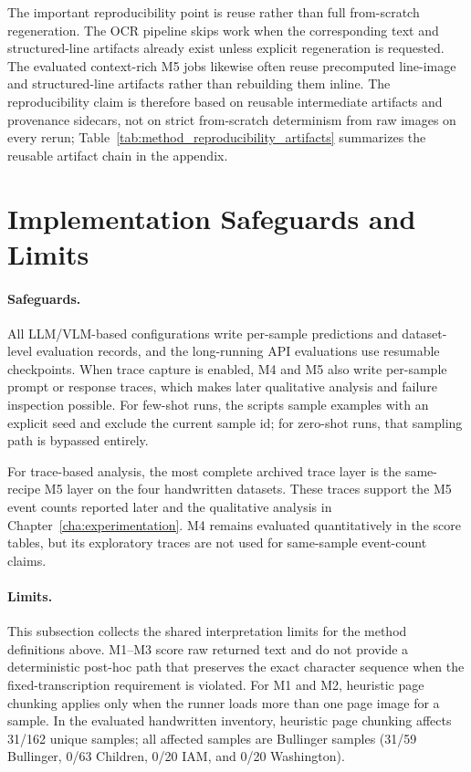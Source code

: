 The important reproducibility point is reuse rather than full from-scratch regeneration. The OCR pipeline skips work when the corresponding text and structured-line artifacts already exist unless explicit regeneration is requested. The evaluated context-rich M5 jobs likewise often reuse precomputed line-image and structured-line artifacts rather than rebuilding them inline. The reproducibility claim is therefore based on reusable intermediate artifacts and provenance sidecars, not on strict from-scratch determinism from raw images on every rerun; Table~\ref{tab:method_reproducibility_artifacts} summarizes the reusable artifact chain in the appendix.

\section{Implementation Safeguards and Limits}
\label{sec:method_safeguards_limits}

\paragraph{Safeguards.}
All LLM/VLM-based configurations write per-sample predictions and dataset-level evaluation records, and the long-running API evaluations use resumable checkpoints. When trace capture is enabled, M4 and M5 also write per-sample prompt or response traces, which makes later qualitative analysis and failure inspection possible. For few-shot runs, the scripts sample examples with an explicit seed and exclude the current sample id; for zero-shot runs, that sampling path is bypassed entirely.

For trace-based analysis, the most complete archived trace layer is the same-recipe M5 layer on the four handwritten datasets. These traces support the M5 event counts reported later and the qualitative analysis in Chapter~\ref{cha:experimentation}. M4 remains evaluated quantitatively in the score tables, but its exploratory traces are not used for same-sample event-count claims.

\paragraph{Limits.}
This subsection collects the shared interpretation limits for the method definitions above. M1--M3 score raw returned text and do not provide a deterministic post-hoc path that preserves the exact character sequence when the fixed-transcription requirement is violated. For M1 and M2, heuristic page chunking applies only when the runner loads more than one page image for a sample. In the evaluated handwritten inventory, heuristic page chunking affects 31/162 unique samples; all affected samples are Bullinger samples (31/59 Bullinger, 0/63 Children, 0/20 IAM, and 0/20 Washington).

